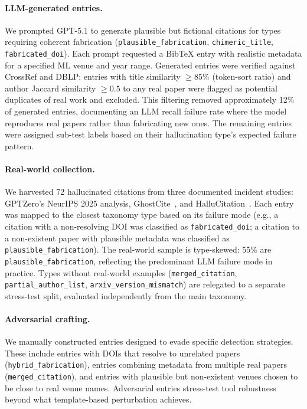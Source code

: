 \paragraph{LLM-generated entries.}
We prompted GPT-5.1 to generate plausible but fictional citations for types requiring coherent fabrication (\texttt{plausible\_fabrication}, \texttt{chimeric\_title}, \texttt{fabricated\_doi}).
Each prompt requested a BibTeX entry with realistic metadata for a specified ML venue and year range.
Generated entries were verified against CrossRef and DBLP: entries with title similarity $\geq 85\%$ (token-sort ratio) and author Jaccard similarity $\geq 0.5$ to any real paper were flagged as potential duplicates of real work and excluded.
This filtering removed approximately 12\% of generated entries, documenting an LLM recall failure rate where the model reproduces real papers rather than fabricating new ones.
The remaining entries were assigned sub-test labels based on their hallucination type's expected failure pattern.

\paragraph{Real-world collection.}
We harvested 72 hallucinated citations from three documented incident studies: GPTZero's NeurIPS 2025 analysis, GhostCite~\citep{ghostcite2026}, and HalluCitation~\citep{hallucitation2026}.
Each entry was mapped to the closest taxonomy type based on its failure mode (e.g., a citation with a non-resolving DOI was classified as \texttt{fabricated\_doi}; a citation to a non-existent paper with plausible metadata was classified as \texttt{plausible\_fabrication}).
The real-world sample is type-skewed: 55\% are \texttt{plausible\_fabrication}, reflecting the predominant LLM failure mode in practice.
Types without real-world examples (\texttt{merged\_citation}, \texttt{partial\_author\_list}, \texttt{arxiv\_version\_mismatch}) are relegated to a separate stress-test split, evaluated independently from the main taxonomy.

\paragraph{Adversarial crafting.}
We manually constructed entries designed to evade specific detection strategies.
These include entries with DOIs that resolve to unrelated papers (\texttt{hybrid\_fabrication}), entries combining metadata from multiple real papers (\texttt{merged\_citation}), and entries with plausible but non-existent venues chosen to be close to real venue names.
Adversarial entries stress-test tool robustness beyond what template-based perturbation achieves.

